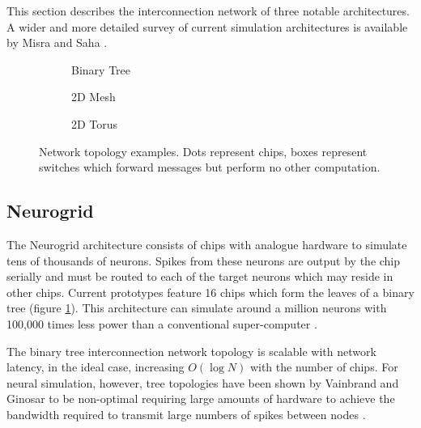 	This section describes the interconnection network of three notable
	architectures. A wider and more detailed survey of current simulation
	architectures is available by Misra and Saha \cite{misra10}.
	
	\begin{figure}
		
		\center
		\begin{subfigure}[b]{0.32\textwidth}
			\center
			
			\caption{Binary Tree}
			\label{fig:binary-tree}
		\end{subfigure}
		\begin{subfigure}[b]{0.32\textwidth}
			\center
			
			\caption{2D Mesh}
			\label{fig:mesh}
		\end{subfigure}
		\begin{subfigure}[b]{0.32\textwidth}
			\center
			
			\caption{2D Torus}
			\label{fig:torus}
		\end{subfigure}
		
		\caption{Network topology examples. Dots represent chips, boxes represent
		switches which forward messages but perform no other computation.}
		\label{fig:network-topology-examples}
		
	\end{figure}
	
	\subsection{Neurogrid}
		
		The Neurogrid architecture consists of chips with analogue hardware to
		simulate tens of thousands of neurons. Spikes from these neurons are output
		by the chip serially and must be routed to each of the target neurons which
		may reside in other chips. Current prototypes feature 16 chips which form
		the leaves of a binary tree (figure \ref{fig:binary-tree}). This
		architecture can simulate around a million neurons with 100,000 times less
		power than a conventional super-computer \cite{choudhary12}.
		
		The binary tree interconnection network topology is scalable with network
		latency, in the ideal case, increasing $O(\log{N})$ with the number of
		chips. For neural simulation, however, tree topologies have been shown by
		Vainbrand and Ginosar to be non-optimal requiring large amounts of hardware
		to achieve the bandwidth required to transmit large numbers of spikes
		between nodes \cite{vainbrand11}.
	
